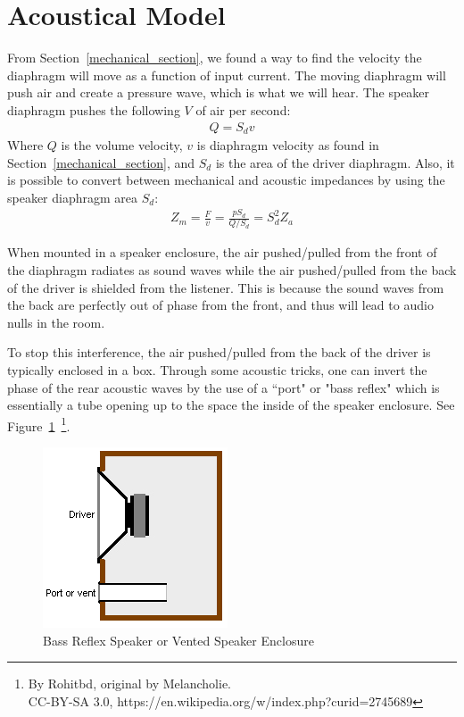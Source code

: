 \documentclass[10pt]{book}
\begin{document}
\section{Acoustical Model}\label{sec:acoustic_model}
From Section~\ref{mechanical_section}, we found a way to find the velocity the diaphragm will move as a function of input current. The moving diaphragm will push air and create a pressure wave, which is what we will hear. The speaker diaphragm pushes the following $V$ of air per second:
\begin{align}
Q=S_dv\label{eq:volume_velocity}
\end{align}
Where $Q$ is the volume velocity, $v$ is diaphragm velocity as found in Section~\ref{mechanical_section}, and $S_d$ is the area of the driver diaphragm. Also, it is possible to convert between mechanical and acoustic impedances by using the speaker diaphragm area $S_d$:
\begin{align}
Z_m=\frac{F}{v}=\frac{pS_d}{Q/S_d}= S_d^2 Z_a\label{eq:acoustic-to-mech_imp}
\end{align}

When mounted in a speaker enclosure, the air pushed/pulled from the front of the diaphragm radiates as sound waves while the air pushed/pulled from the back of the driver is shielded from the listener. This is because the sound waves from the back are perfectly out of phase from the front, and thus will lead to audio nulls in the room.

To stop this interference, the air pushed/pulled from the back of the driver is typically enclosed in a box. Through some acoustic tricks, one can invert the phase of the rear acoustic waves by the use of a ``port" or "bass reflex" which is essentially a tube opening up to the space the inside of the speaker enclosure. See Figure~\ref{bass_reflex}~\footnote{By Rohitbd, original by Melancholie.\\
CC-BY-SA 3.0, https://en.wikipedia.org/w/index.php?curid=2745689}.

\begin{figure}
\centering
\includegraphics[height=0.25\textheight]{Bass_reflex_spk.png}
\caption{Bass Reflex Speaker or Vented Speaker Enclosure}\label{bass_reflex}
\end{figure}
\end{document}
